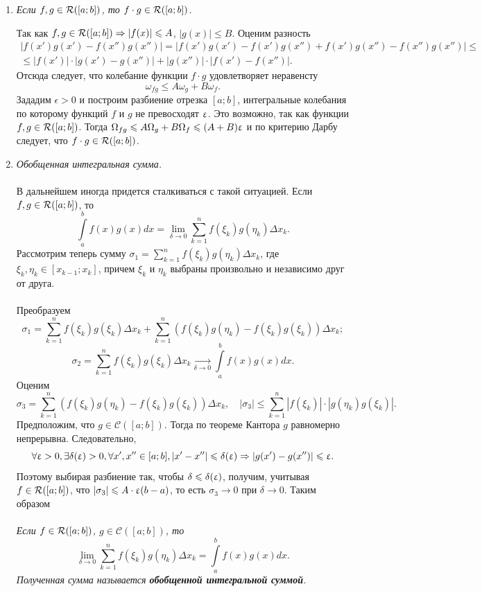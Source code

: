 \begin{enumerate}
\begin{Proof}
		\end{Proof}
	\item \textit{Если $f,g \in\mathcal{R}([a; b])$, то $f\cdot g \in\mathcal{R}([a; b])$.}
	\begin{Proof}
		Так как $f,g \in\mathcal{R}([a; b]) \Rightarrow |f(x)|\leqslant A$, $|g(x)|\leq B$. Оценим разность \begin{multline*}
			|f(x')g(x') - f(x'')g(x'')| = |f(x')g(x') - f(x')g(x'') + f(x')g(x'') - f(x'')g(x'')| \leq\\\leq |f(x')|\cdot |g(x')-g(x'')| + |g(x'')|\cdot |f(x') - f(x'')|.
			\end{multline*}
		Отсюда следует, что колебание функции $f\cdot g$ удовлетворяет неравенсту $$\omega_{fg}\leq A\omega_g + B\omega_f.$$
		Зададим $\epsilon > 0$ и построим разбиение отрезка $[a;b]$, интегральные колебания по которому функций $f$ и $g$ не превосходят $\upvarepsilon$. Это возможно, так как функции $f,g\in\mathcal{R}([a; b])$. Тогда $\Omega_{fg}\leqslant A\Omega_g + B\Omega_f\leqslant (A+B)\upvarepsilon$ и по критерию Дарбу следует, что $f\cdot g\in\mathcal{R}([a; b])$.
		\end{Proof}
	\item \textit{Обобщенная интегральная сумма.}\\\\
	В дальнейшем иногда придется сталкиваться с такой ситуацией. Если $f,g\in\mathcal{R}([a; b])$, то $$\int\limits_a^bf(x)g(x)dx = \lim\limits_{\delta\to0}\sum\limits^n_{k=1}f(\xi_k)g(\eta_k)\Delta x_k.$$
	Рассмотрим теперь сумму $\sigma_1 = \sum\limits^n_{k=1}f(\xi_k)g(\eta_k)\Delta x_k$, где $\xi_k, \eta_k \in [x_{k-1};x_k]$, причем $\xi_k$ и $\eta_k$ выбраны произвольно и независимо друг от друга.\\\\
	Преобразуем $$\sigma_1 = \sum\limits^n_{k=1}f(\xi_k)g(\xi_k)\Delta x_k + \sum\limits^n_{k=1}(f(\xi_k)g(\eta_k) - f(\xi_k)g(\xi_k))\Delta x_k;$$
	$$\sigma_2 = \sum\limits^n_{k=1}f(\xi_k)g(\xi_k)\Delta x_k\underset{\delta \to 0}{\longrightarrow}\int\limits_a^bf(x)g(x)dx.$$
	Оценим $$\sigma_3 = \sum\limits^n_{k=1}(f(\xi_k)g(\eta_k) - f(\xi_k)g(\xi_k))\Delta x_k,\quad |\sigma_3| \leq \sum\limits^n_{k=1}|f(\xi_k)|\cdot |g(\eta_k)g(\xi_k)|.$$
	Предположим, что $g\in \mathcal{C}([a;b])$. Тогда по теореме Кантора $g$ равномерно непрерывна. Следовательно, $$\forall \upvarepsilon > 0, \exists\delta(\upvarepsilon)>0, \forall x', x'' \in [a;b], |x'-x''|\leqslant \delta(\upvarepsilon)\Rightarrow |g(x') - g(x'')|\leqslant \upvarepsilon.$$
	Поэтому выбирая разбиение так, чтобы $\delta \leqslant \delta (\upvarepsilon)$, получим, учитывая $f\in\mathcal{R}([a; b])$, что $|\sigma_3|\leqslant A\cdot \upvarepsilon (b-a)$, то есть $\sigma_3\to0$ при $\delta \to 0$. Таким образом\\\\
	\textit{Если $f\in\mathcal{R}([a; b])$, $g\in\mathcal{C}([a;b])$, то $$\lim\limits_{\delta\to0}\sum\limits^n_{k=1}f(\xi_k)g(\eta_k)\Delta x_k = \int\limits_a^bf(x)g(x)dx.$$ Полученная сумма называется \textbf{обобщенной интегральной суммой}.}
\end{enumerate}
